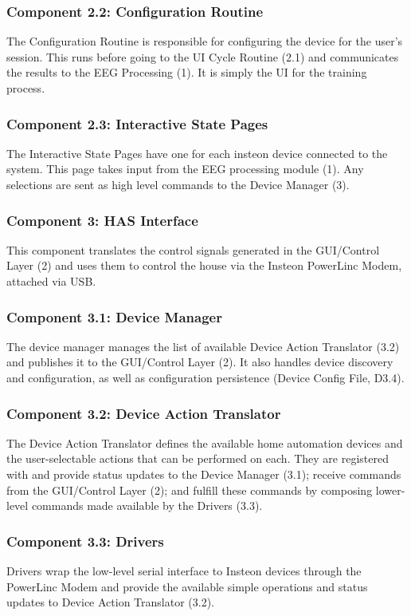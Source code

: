 \documentclass{article}
\begin{document}
\subsubsection{Component 2.2: Configuration Routine}
The Configuration Routine is responsible for configuring the device for the user's session. This runs before going to the UI Cycle Routine (2.1) and communicates the results to the EEG Processing (1). It is simply the UI for the training process.

\subsubsection{Component 2.3: Interactive State Pages}
The Interactive State Pages have one for each insteon device connected to the system. This page takes input from the EEG processing module (1). Any selections are sent as high level commands to the Device Manager (3).

\subsubsection{Component 3: HAS Interface}
This component translates the control signals generated in the GUI/Control
Layer (2) and uses them to control the house via the Insteon PowerLinc Modem,
attached via USB.

\subsubsection{Component 3.1: Device Manager}
The device manager manages the list of available Device Action Translator (3.2) and publishes
it to the GUI/Control Layer (2). It also handles device discovery and
configuration, as well as configuration persistence (Device Config File,
D3.4).

\subsubsection{Component 3.2: Device Action Translator}
The Device Action Translator defines the available home automation devices and the user-selectable
actions that can be performed on each. They are registered with and provide
status updates to the Device Manager (3.1); receive commands from the
GUI/Control Layer (2); and fulfill these commands by composing lower-level
commands made available by the Drivers (3.3).

\subsubsection{Component 3.3: Drivers}
Drivers wrap the low-level serial interface to Insteon devices through the
PowerLinc Modem and provide the available simple operations and status updates
to Device Action Translator (3.2).
\end{document}
